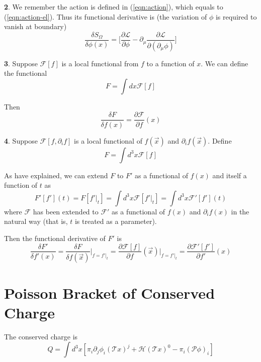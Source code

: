 \documentclass[12pt]{book}
\begin{document}
	\textbf 2. We remember the action is defined in (\ref{eqn:action}), which equals to (\ref{eqn:action-el}). Thus its functional derivative is (the variation of $\phi$ is required to vanish at boundary)	
	\begin{equation}
		\frac{\delta S_\Omega}{\delta \phi(x)}=\Big[\frac{\partial\mathcal{L}}{\partial\phi}-\partial_\mu\frac{\partial\mathcal{L}}{\partial(\partial_\mu\phi)}\Big]
	\end{equation}
	
	\textbf 3. Suppose $\mathcal F[f]$ is a local functional from $f$ to a function of $x$. We can define the functional	
	\begin{equation}
		 F=\int dx \mathcal F[f]
	\end{equation}
	
	Then	
	\begin{equation}
		\frac{\delta F}{\delta f(x)}=\frac{\partial\mathcal{F}}{\partial f}(x)
	\end{equation}
	
	\textbf 4. Suppose $\mathcal{F}[f,\partial_if]$ is a local functional of $f(\vec x)$ and $\partial_if(\vec x)$. Define
	\begin{equation}
		F=\int d^3x \mathcal F[f]
	\end{equation}
	
	As have explained, we can extend $F$ to $F'$ as a functional of $f(x)$ and itself a function of $t$ as 
	\begin{equation}
		F'[f'](t)=F[f'|_t]=\int d^3x \mathcal F[f'|_t]=\int d^3x \mathcal F'[f'] (t)
	\end{equation}
	where $\mathcal{F}$ has been extended to $\mathcal{F}'$ as a functional of $f(x)$ and $\partial_if(x)$ in the natural way (that is, $t$ is treated as a parameter).
	
	Then the functional derivative of $F'$ is	
	\begin{equation}
		\frac{\delta F'}{\delta f'(x)}=\frac{\delta F}{\delta f(\vec x)}\Big|_{f=f'|_t}=\frac{\partial\mathcal{F}[f]}{\partial f}(\vec x)\Big|_{f=f'|_t}=\frac{\partial\mathcal{F}'[f']}{\partial f'}(x) \label{eqn:fun-deri}
	\end{equation}
	
	\chapter{Poisson Bracket of Conserved Charge}
	\label{app:poisson}
	
	The conserved charge is	
	\begin{equation}
		Q=\int d^3x[\pi_i\partial_j\phi_i(\mathcal Tx)^j+\mathcal{H}(\mathcal Tx)^0-\pi_i(\mathcal P\phi)_i] \label{eqn:charge-hami}
	\end{equation}
	
\end{document}
